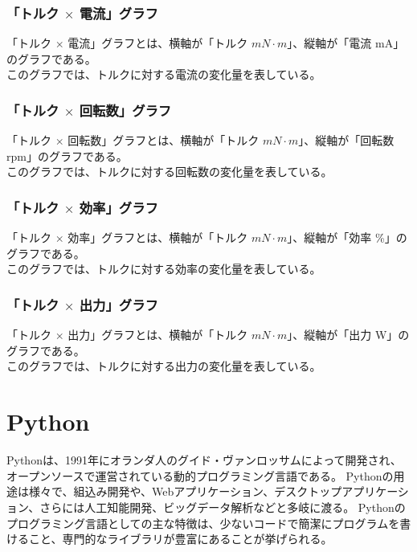 \subsubsection{「トルク $\times$ 電流」グラフ}\label{sub:sub:torden}
「トルク $\times$ 電流」グラフとは、横軸が「トルク $mN \cdot m$」、縦軸が「電流 mA」のグラフである。\\
このグラフでは、トルクに対する電流の変化量を表している。
\subsubsection{「トルク $\times$ 回転数」グラフ}\label{sub:sub:torkaiten}
「トルク $\times$ 回転数」グラフとは、横軸が「トルク $mN \cdot m$」、縦軸が「回転数 rpm」のグラフである。\\
このグラフでは、トルクに対する回転数の変化量を表している。
\subsubsection{「トルク $\times$ 効率」グラフ}\label{sub:sub:torkouritu}
「トルク $\times$ 効率」グラフとは、横軸が「トルク $mN \cdot m$」、縦軸が「効率 \%」のグラフである。\\
このグラフでは、トルクに対する効率の変化量を表している。
\subsubsection{「トルク $\times$ 出力」グラフ}\label{sub:sub:torsyutu}
「トルク $\times$ 出力」グラフとは、横軸が「トルク $mN \cdot m$」、縦軸が「出力 W」のグラフである。\\
このグラフでは、トルクに対する出力の変化量を表している。
  \section{Python}\label{python}
Pythonは、1991年にオランダ人のグイド・ヴァンロッサムによって開発され、オープンソースで運営されている動的プログラミング言語である\cite{pythonoya}。
Pythonの用途は様々で、組込み開発や、Webアプリケーション、デスクトップアプリケーション、さらには人工知能開発、ビッグデータ解析などと多岐に渡る\cite{pythonsamu}。
Pythonのプログラミング言語としての主な特徴は、少ないコードで簡潔にプログラムを書けること、専門的なライブラリが豊富にあることが挙げられる。


